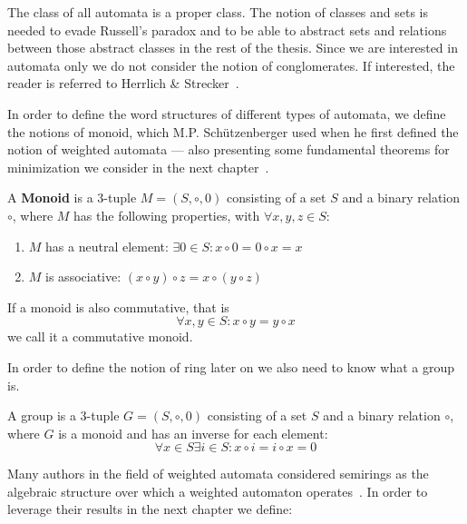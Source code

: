             The class of all automata is a proper class. The notion of classes and sets is needed to evade Russell's paradox and to be able to abstract sets and relations between those abstract classes in the rest of the thesis. Since we are interested in automata only we do not consider the notion of conglomerates. If interested, the reader is referred to Herrlich \& Strecker~\autocite{CT2}.
                        
            In order to define the word structures of different types of automata, we define the notions of monoid, which M.P. Schützenberger used when he first defined the notion of weighted automata --- also presenting some fundamental theorems for minimization we consider in the next chapter~\autocite{schutz}.            
            \begin{definition}[Monoid]
            A \textbf{Monoid} is a 3-tuple $M = (S, \circ, 0)$ consisting of a set $S$ and a binary relation $\circ$, where $M$ has the following properties, with $\forall x, y, z \in S$:
            \begin{enumerate}
            \item $M$ has a neutral element: $\exists 0 \in S: x \circ 0 = 0 \circ x = x $
             \item $M$ is associative: $(x \circ y) \circ z = x \circ (y \circ z)$ 
            \end{enumerate}
            If a monoid is also commutative, that is 
            \[ \forall x,y \in S: x \circ y = y \circ x \]
            we call it a commutative monoid.
            \end{definition}
            
            
            In order to define the notion of ring later on we also need to know what a group is.
            \begin{definition}[Group]
            A group is a 3-tuple $G = (S, \circ, 0)$ consisting of a set $S$ and a binary relation $\circ$, where $G$ is a monoid and has an inverse for each element:
            \[ \forall x \in S \exists i \in S: x \circ i = i \circ x = 0 \]
            \end{definition}
            
            Many authors in the field of weighted automata considered semirings as the algebraic structure over which a weighted automaton operates~\autocite{HWA, WA}. In order to leverage their results in the next chapter we define:
            \begin{definition}[Semiring]
            \end{definition}            
            
